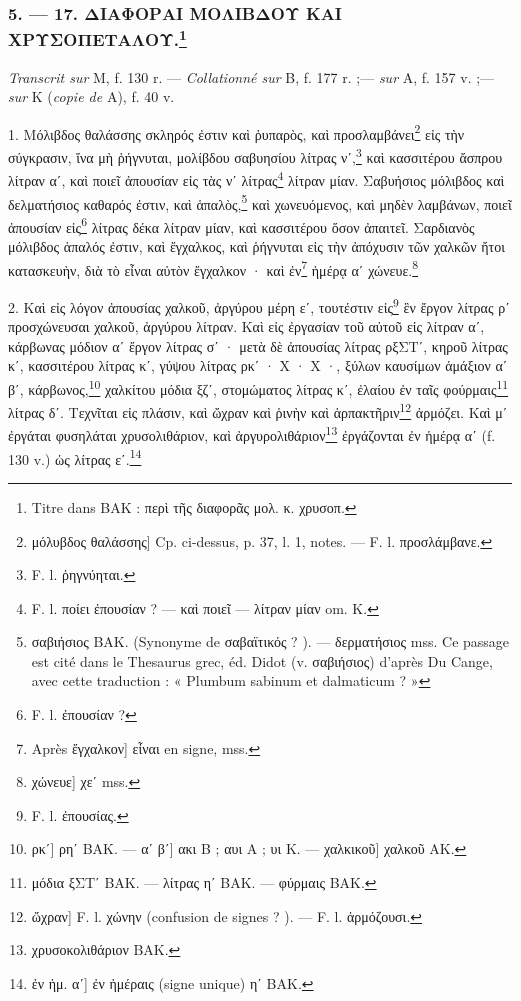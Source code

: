 \documentclass[a4paper, 11pt, oneside, polutonikogreek, french]{article}
\begin{document}
\bigskip
\centerline{\EightStarTaper}
\centerline{\EightStarTaper\EightStarTaper}
\bigskip

\subsubsection[5. --- 17. ΔΙΑΦΟΡΑΙ ΜΟΛΙΒΔΟΥ ΚΑΙ ΧΡΥΣΟΠΕΤΑΛΟΥ.]{5. --- 17. ΔΙΑΦΟΡΑΙ ΜΟΛΙΒΔΟΥ ΚΑΙ ΧΡΥΣΟΠΕΤΑΛΟΥ.\footnote{Titre dans BAK : περὶ τῆς διαφορᾶς μολ. κ. χρυσοπ.}}

\emph{Transcrit sur} M, f. 130 r. --- \emph{Collationné sur} B, f. 177 r. ;--- \emph{sur} A, f. 157 v. ;--- \emph{sur} K (\emph{copie de} A), f. 40 v.

\bigskip

1. Μόλιβδος θαλάσσης σκληρός ἐστιν καὶ ῥυπαρὸς, καὶ προσλαμβάνει\footnote{μόλυβδος θαλάσσης] Cp. ci-dessus, p. 37, l. 1, notes. --- F. l. προσλάμβανε.} εἰς τὴν σύγκρασιν, ἵνα μὴ ῥήγνυται, μολίβδου σαβυησίου λίτρας νʹ,\footnote{F. l. ῥηγνύηται.} καὶ κασσιτέρου ἄσπρου λίτραν αʹ, καὶ ποιεῖ ἀπουσίαν εἰς τὰς νʹ λίτρας\footnote{F. l. ποίει ἐπουσίαν ? --- καὶ ποιεῖ --- λίτραν μίαν om. Κ.} λίτραν μίαν. Σαβυήσιος μόλιβδος καὶ δελματήσιος καθαρός ἐστιν, καὶ ἁπαλὸς,\footnote{σαβιήσιος BAK. (Synonyme de σαβαϊτικός ? ). --- δερματήσιος mss. Ce passage est cité dans le Thesaurus grec, éd. Didot (v. σαβιήσιος) d'après Du Cange, avec cette traduction : « Plumbum sabinum et dalmaticum ? »} καὶ χωνευόμενος, καὶ μηδὲν λαμβάνων, ποιεῖ ἀπουσίαν εἰς\footnote{F. l. ἐπουσίαν ?} λίτρας δέκα λίτραν μίαν, καὶ κασσιτέρου ὅσον ἀπαιτεῖ. Σαρδιανὸς μόλιβδος ἁπαλός ἐστιν, καὶ ἔγχαλκος, καὶ ῥήγνυται εἰς τὴν ἀπόχυσιν τῶν χαλκῶν ἤτοι κατασκευὴν, διὰ τὸ εἶναι αὐτὸν ἔγχαλκον · καὶ ἐν\footnote{Après ἔγχαλκον] εἶναι en signe, mss.} ἡμέρᾳ αʹ χώνευε.\footnote{χώνευε] χεʹ mss.}

2. Καὶ εἰς λόγον ἀπουσίας χαλκοῦ, ἀργύρου μέρη εʹ, τουτέστιν εἰς\footnote{F. l. ἐπουσίας.} ἓν ἔργον λίτρας ρʹ προσχώνευσαι χαλκοῦ, ἀργύρου λίτραν. Καὶ εἰς ἐργασίαν τοῦ αὐτοῦ εἰς λίτραν αʹ, κάρβωνας μόδιον αʹ ἔργον λίτρας σʹ · μετὰ δὲ ἀπουσίας λίτρας ρξΣΤʹ, κηροῦ λίτρας κʹ, κασσιτέρου λίτρας κʹ, γύψου λίτρας ρκʹ · Χ · Χ ·, ξύλων καυσίμων ἁμάξιον αʹ βʹ, κάρβωνος,\footnote{ρκʹ] ρηʹ BAK. --- αʹ βʹ] ακι B ; αυι A ; υι K. --- χαλκικοῦ] χαλκοῦ AK.} χαλκίτου μόδια ξζʹ, στομώματος λίτρας κʹ, ἐλαίου ἐν ταῖς φούρμαις\footnote{μόδια ξΣΤʹ BAK. --- λίτρας ηʹ BAK. --- φύρμαις BAK.} λίτρας δʹ. Τεχνῖται εἰς πλάσιν, καὶ ὤχραν καὶ ῥινὴν καὶ ἁρπακτῆριν\footnote{ὤχραν] F. l. χώνην (confusion de signes ? ). --- F. l. ἁρμόζουσι.} ἀρμόζει. Καὶ μʹ ἐργάται φυσηλάται χρυσολιθάριον, καὶ ἀργυρολιθάριον\footnote{χρυσοκολιθάριον BAK.} ἐργάζονται ἐν ἡμέρᾳ αʹ (f. 130 v.) ὡς λίτρας εʹ.\footnote{ἐν ἡμ. αʹ] ἐν ἠμέραις (signe unique) ηʹ BAK.}
\end{document}
